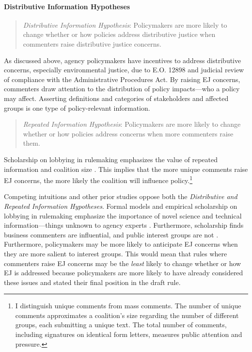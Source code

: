\documentclass[
      12pt,
        ]{article}
\begin{document}
\hypertarget{distributive-information-hypotheses}{%
\paragraph{Distributive Information Hypotheses}\label{distributive-information-hypotheses}}

\begin{quote}
\emph{Distributive Information Hypothesis}: Policymakers are more likely to change whether or how policies address distributive justice when commenters raise distributive justice concerns.
\end{quote}

As discussed above, agency policymakers have incentives to address distributive concerns, especially environmental justice, due to E.O. 12898 and judicial review of compliance with the Administrative Procedures Act. By raising EJ concerns, commenters draw attention to the distribution of policy impacts---who a policy may affect. Asserting definitions and categories of stakeholders and affected groups is one type of policy-relevant information.

\begin{quote}
\emph{Repeated Information Hypothesis}: Policymakers are more likely to change whether or how policies address concerns when more commenters raise them.
\end{quote}

Scholarship on lobbying in rulemaking emphasizes the value of repeated information and coalition size \citep{Nelson2012}. This implies that the more unique comments raise EJ concerns, the more likely the coalition will influence policy.\footnote{I distinguish unique comments from mass comments. The number of unique comments approximates a coalition's size regarding the number of different groups, each submitting a unique text. The total number of comments, including signatures on identical form letters, measures public attention and pressure.}

Competing intuitions and other prior studies oppose both the \emph{Distributive and Repeated Information Hypotheses}. Formal models and empirical scholarship on lobbying in rulemaking emphasize the importance of novel science and technical information---things unknown to agency experts \citep{Wagner2010}. Furthermore, scholarship finds business commenters are influential, and public interest groups are not \citep{Yackee2006JOP, Haeder2015}. Furthermore, policymakers may be more likely to anticipate EJ concerns when they are more salient to interest groups. This would mean that rules where commenters raise EJ concerns may be the \emph{least} likely to change whether or how EJ is addressed because policymakers are more likely to have already considered these issues and stated their final position in the draft rule.
\end{document}
